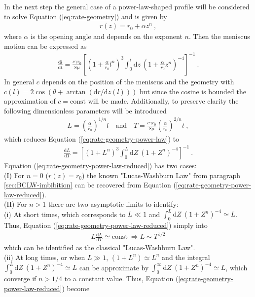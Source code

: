 \documentclass[aip, amsmath, amssymb, reprint, twocolumn, floatfix]{revtex4-1}
\newcommand{\dldt}{\frac{\mathrm{d}l}{\mathrm{d}t}}
\newcommand{\dLdT}{\frac{\mathrm{d}L}{\mathrm{d}T}}
\newcommand{\dz}{\mathrm{d}z}
\newcommand{\dZ}{\mathrm{d}Z}
\begin{document}
In the next step the general case of a power-law-shaped profile will be considered to solve Equation (\ref{eq:rate-geometry}) and is given by
\begin{gather}
	r(z) = r_0 + \alpha z^n~,
	\label{eq:power-law}
\end{gather}
where $\alpha$ is the opening angle and depends on the exponent $n$. Then the meniscus motion can be expressed as 
\begin{gather}
	\dldt = \frac{c \gamma r_0}{8\mu} \left[ \left(1 + \frac{\alpha}{r_0} l^n \right)^3 \int_0^{l}\!\!\!\dz~\left(1 + \frac{\alpha}{r_0} z^n \right)^{-4} \right]^{-1}~.
	\label{eq:rate-geometry-power-law}
\end{gather}
In general $c$ depends on the position of the meniscus and the geometry with $c(l) = 2\cos(\theta + \arctan(\mathrm{d}r/\mathrm{d}z(l)))$ but since the cosine is bounded the approximation of $c = \text{const}$ will be made. Additionally, to preserve clarity the following dimensionless parameters will be introduced
\begin{gather}
	L = \left(\frac{\alpha}{r_0}\right)^{1/n} l\quad\text{and}\quad T = \frac{c\gamma r_0}{8\mu} \left(\frac{\alpha}{r_0}\right)^{2/n} t~,
\end{gather}
which reduces Equation (\ref{eq:rate-geometry-power-law}) to
\begin{gather}
	\dLdT = \left[ \left(1 + L^n \right)^3 \int_0^{L}\!\!\!\dZ~\left(1 + Z^n \right)^{-4} \right]^{-1}~.
	\label{eq:rate-geometry-power-law-reduced}
\end{gather}
Equation (\ref{eq:rate-geometry-power-law-reduced}) has two cases:\\
(I) For $n = 0$ ($r(z) = r_0$) the known "Lucas-Washburn Law" from paragraph \ref{sec:BCLW-imbibition} can be recovered from Equation (\ref{eq:rate-geometry-power-law-reduced}).\\
 (II) For $n > 1$ there are two asymptotic limits to identify:\\
(i) At short times, which corresponds to $L \ll 1$ and $\int_0^{L}\!\dZ~\left(1 + Z^n \right)^{-4} \simeq L$. Thus, Equation (\ref{eq:rate-geometry-power-law-reduced}) simply into
\begin{gather}
	L \dLdT \simeq \text{const}~ \Rightarrow \boxed{L \sim T^{1/2}}
\end{gather}
which can be identified as the classical "Lucas-Washburn Law".\\
(ii) At long times, or when $L \gg 1$, $(1+L^n) \simeq L^n$ and the integral $\int_0^{L}\!\!\!\dZ~\left(1 + Z^n \right)^{-4} \simeq L$ can be approximate by $\int_0^{\infty}\!\dZ~\left(1 + Z^n \right)^{-4} \simeq L$, which converge if $n > 1/4$ to a constant value. Thus, Equation (\ref{eq:rate-geometry-power-law-reduced}) become
\end{document}
